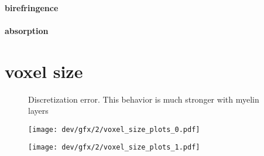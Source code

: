\paragraph{birefringence}
\paragraph{absorption}
% 
% 
% 
\section{voxel size}
% 
\begin{figure}[!t]
\centering
\resizebox{1.0\textwidth}{!}{
\tikzset{external/export=false}
}
\caption[Discretization error]{Discretization error.
This behavior is much stronger with myelin layers}
\label{fig:vectorfield_disc_error}
\end{figure}
% 
\begin{figure}[p]
\centering
\texttt{[image: dev/gfx/2/voxel\_size\_plots\_0.pdf]}
\caption[]{\dummy{}}
\label{fig:voxelsize}
\end{figure}
% 
\begin{figure}[p]
\centering
\texttt{[image: dev/gfx/2/voxel\_size\_plots\_1.pdf]}
\caption[]{\dummy{}}
\label{fig:voxelsize}
\end{figure}
% 
% 
% 

